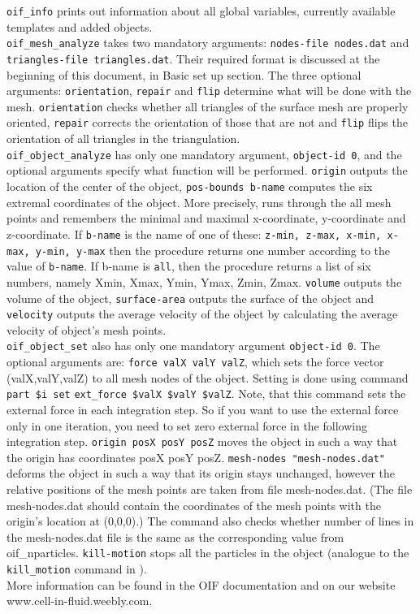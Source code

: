 \documentclass[
a4paper,                        %
11pt,                           %
twoside,                        %
footsepline,                    %
headsepline,                    %
headexclude,                    %
footexclude,                    %
pagesize,                       %
]{scrartcl}
\begin{document}
\verb|oif_info| prints out information about all global variables, currently available templates and added objects.\\

\verb|oif_mesh_analyze| takes two mandatory arguments: \verb|nodes-file nodes.dat| and \verb|triangles-file triangles.dat|. Their required format is discussed at the beginning of this document, in Basic set up section. The three optional arguments:  \verb|orientation|, \verb|repair| and \verb|flip| determine what will be done with the mesh. \verb|orientation| checks whether all triangles of the surface mesh are properly oriented, \verb|repair| corrects the orientation of those that are not and \verb|flip| flips the orientation of all triangles in the triangulation.\\

\verb|oif_object_analyze| has only one mandatory argument, \verb|object-id 0|, and the optional arguments specify what function will be performed. \verb|origin| outputs the location of the center of the object, \verb|pos-bounds b-name| computes the six extremal coordinates of the object. More precisely, runs through the all mesh points and remembers the minimal and maximal x-coordinate, y-coordinate and z-coordinate. If \verb|b-name| is the name of one of these: \verb|z-min, z-max, x-min, x-max, y-min, y-max| then the procedure returns one number according to the value of \verb|b-name|. If b-name is \verb|all|, then the procedure returns a list of six numbers, namely Xmin, Xmax, Ymin, Ymax, Zmin, Zmax. \verb|volume| outputs the volume of the object, \verb|surface-area| outputs the surface of the object and \verb|velocity| outputs the average velocity of the object by calculating the average velocity of object's mesh points.\\

\verb|oif_object_set| also has only one mandatory argument \verb|object-id 0|. The optional arguments are: \verb|force valX valY valZ|, which sets the force vector (valX,valY,valZ) to all mesh nodes of the object. Setting is done using \es command \verb|part $i set| \verb|ext_force $valX $valY $valZ|. Note, that this command sets the external force in each integration step. So if you want to use the external force only in one iteration, you need to set zero external force in the following integration step. \verb|origin posX posY posZ| moves the object in such a way that the origin has coordinates posX posY posZ. \verb|mesh-nodes "mesh-nodes.dat"| deforms the object in such a way that its origin stays unchanged, however the relative positions of the mesh points are taken from file mesh-nodes.dat. (The file mesh-nodes.dat should contain the coordinates of the mesh points with the origin's location at (0,0,0).) The command also checks whether number of lines in the mesh-nodes.dat file is the same as the corresponding value from oif\_nparticles. \verb|kill-motion| stops all the particles in the object (analogue to the \verb|kill_motion| command in \es).\\

More information can be found in the OIF documentation and on our website www.cell-in-fluid.weebly.com.
\end{document}
